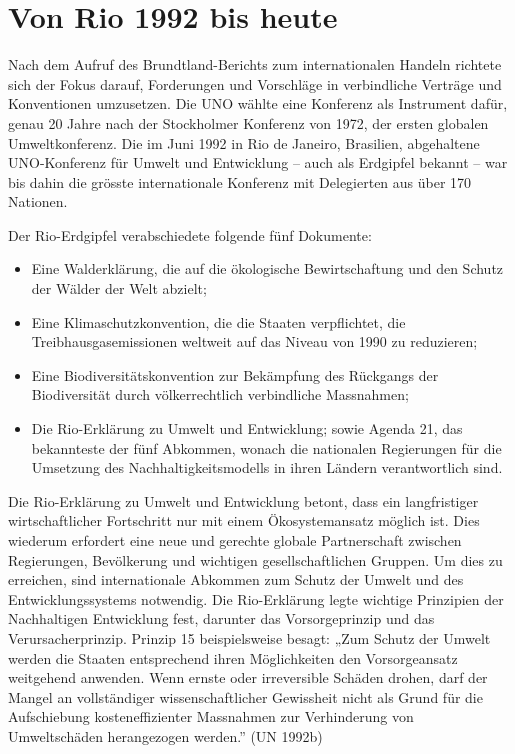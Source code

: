 \documentclass[
  nswissgerman,
  a4paper,
  DIV=11,
  numbers=noendperiod,
  oneside,
  openany]{scrreprt}
\providecommand{\tightlist}{%
  \setlength{\itemsep}{0pt}\setlength{\parskip}{0pt}}
\begin{document}
\section{Von Rio 1992 bis heute}\label{von-rio-1992-bis-heute}

Nach dem Aufruf des Brundtland-Berichts zum internationalen Handeln
richtete sich der Fokus darauf, Forderungen und Vorschläge in
verbindliche Verträge und Konventionen umzusetzen. Die UNO wählte eine
Konferenz als Instrument dafür, genau 20 Jahre nach der Stockholmer
Konferenz von 1972, der ersten globalen Umweltkonferenz. Die im Juni
1992 in Rio de Janeiro, Brasilien, abgehaltene UNO-Konferenz für Umwelt
und Entwicklung -- auch als Erdgipfel bekannt -- war bis dahin die
grösste internationale Konferenz mit Delegierten aus über 170 Nationen.

Der Rio-Erdgipfel verabschiedete folgende fünf Dokumente:

\begin{itemize}
\tightlist
\item
  Eine Walderklärung, die auf die ökologische Bewirtschaftung und den
  Schutz der Wälder der Welt abzielt;
\item
  Eine Klimaschutzkonvention, die die Staaten verpflichtet, die
  Treibhausgasemissionen weltweit auf das Niveau von 1990 zu reduzieren;
\item
  Eine Biodiversitätskonvention zur Bekämpfung des Rückgangs der
  Biodiversität durch völkerrechtlich verbindliche Massnahmen;
\item
  Die Rio-Erklärung zu Umwelt und Entwicklung; sowie Agenda 21, das
  bekannteste der fünf Abkommen, wonach die nationalen Regierungen für
  die Umsetzung des Nachhaltigkeitsmodells in ihren Ländern
  verantwortlich sind.
\end{itemize}

Die Rio-Erklärung zu Umwelt und Entwicklung betont, dass ein
langfristiger wirtschaftlicher Fortschritt nur mit einem Ökosystemansatz
möglich ist. Dies wiederum erfordert eine neue und gerechte globale
Partnerschaft zwischen Regierungen, Bevölkerung und wichtigen
gesellschaftlichen Gruppen. Um dies zu erreichen, sind internationale
Abkommen zum Schutz der Umwelt und des Entwicklungssystems notwendig.
Die Rio-Erklärung legte wichtige Prinzipien der Nachhaltigen Entwicklung
fest, darunter das Vorsorgeprinzip und das Verursacherprinzip. Prinzip
15 beispielsweise besagt: „Zum Schutz der Umwelt werden die Staaten
entsprechend ihren Möglichkeiten den Vorsorgeansatz weitgehend anwenden.
Wenn ernste oder irreversible Schäden drohen, darf der Mangel an
vollständiger wissenschaftlicher Gewissheit nicht als Grund für die
Aufschiebung kosteneffizienter Massnahmen zur Verhinderung von
Umweltschäden herangezogen werden.'' (UN 1992b)
\end{document}
